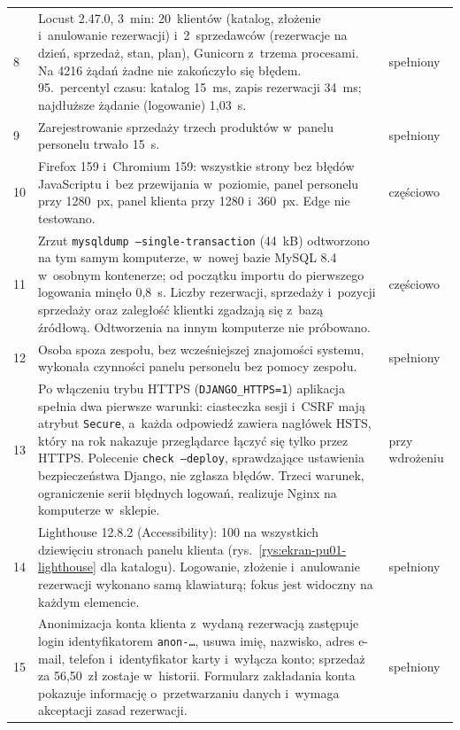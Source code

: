 \documentclass[12pt,a4paper,oneside]{article}
\newcounter{pu}
\begin{document}
{\begin{longtable}{@{}L{0.6cm}L{11.2cm}L{2.4cm}@{}}
	8 & Locust 2.47.0, 3~min: 20~klientów (katalog, złożenie i~anulowanie rezerwacji) i~2~sprzedawców (rezerwacje na dzień, sprzedaż, stan, plan), Gunicorn z~trzema procesami. Na 4216 żądań żadne nie zakończyło się błędem. 95.~percentyl czasu: katalog 15~ms, zapis rezerwacji 34~ms; najdłuższe żądanie (logowanie) 1,03~s. & spełniony \\
	9 & Zarejestrowanie sprzedaży trzech produktów w~panelu personelu trwało 15~s. & spełniony \\
	10 & Firefox 159 i~Chromium 159: wszystkie strony bez błędów JavaScriptu i~bez przewijania w~poziomie, panel personelu przy 1280~px, panel klienta przy 1280 i~360~px. Edge nie testowano. & częściowo \\
	11 & Zrzut \texttt{mysqldump --single-transaction} (44~kB) odtworzono na tym samym komputerze, w~nowej bazie MySQL 8.4 w~osobnym kontenerze; od początku importu do pierwszego logowania minęło 0,8~s. Liczby rezerwacji, sprzedaży i~pozycji sprzedaży oraz zaległość klientki zgadzają się z~bazą źródłową. Odtworzenia na innym komputerze nie próbowano. & częściowo \\
	12 & Osoba spoza zespołu, bez wcześniejszej znajomości systemu, wykonała czynności panelu personelu bez pomocy zespołu. & spełniony \\
	13 & Po włączeniu trybu HTTPS (\texttt{DJANGO\_HTTPS=1}) aplikacja spełnia dwa pierwsze warunki: ciasteczka sesji i~CSRF mają atrybut \texttt{Secure}, a~każda odpowiedź zawiera nagłówek HSTS, który na rok nakazuje przeglądarce łączyć się tylko przez HTTPS. Polecenie \texttt{check --deploy}, sprawdzające ustawienia bezpieczeństwa Django, nie zgłasza błędów. Trzeci warunek, ograniczenie serii błędnych logowań, realizuje Nginx na komputerze w~sklepie. & przy wdrożeniu \\
	14 & Lighthouse 12.8.2 (Accessibility): 100 na wszystkich dziewięciu stronach panelu klienta (rys.~\ref{rys:ekran-pu01-lighthouse} dla katalogu). Logowanie, złożenie i~anulowanie rezerwacji wykonano samą klawiaturą; fokus jest widoczny na każdym elemencie. & spełniony \\
	15 & Anonimizacja konta klienta z~wydaną rezerwacją zastępuje login identyfikatorem \texttt{anon-…}, usuwa imię, nazwisko, adres e-mail, telefon i~identyfikator karty i~wyłącza konto; sprzedaż za 56,50~zł zostaje w~historii. Formularz zakładania konta pokazuje informację o~przetwarzaniu danych i~wymaga akceptacji zasad rezerwacji. & spełniony \\
\end{longtable}
}
\end{document}
